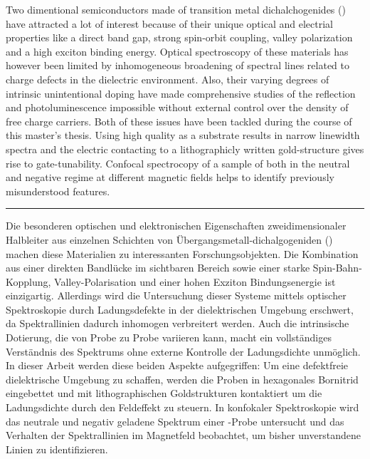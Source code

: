 
Two dimentional semiconductors made of transition metal dichalchogenides (\tmds\!) have attracted a lot of interest because of their unique optical and electrial properties like a direct band gap, strong spin-orbit coupling, valley polarization and a high exciton binding energy. Optical spectroscopy of these materials has however been limited by inhomogeneous broadening of spectral lines related to charge defects in the dielectric environment. Also, their varying degrees of intrinsic unintentional doping have made comprehensive studies of the reflection and photoluminescence impossible without external control over the density of free charge carriers. Both of these issues have been tackled during the course of this master's thesis. Using high quality \hbng as a substrate results in narrow linewidth \pl spectra and the electric contacting to a lithographicly written gold-structure gives rise to gate-tunability. Confocal spectrocopy of a sample of \wse both in the neutral and negative regime at different magnetic fields helps to identify previously misunderstood features.\newline
\begin{center}
\par\rule[8pt]{0.7\textwidth}{0.5pt}
\end{center}
Die besonderen optischen und elektronischen Eigenschaften zweidimensionaler Halbleiter aus einzelnen Schichten von Übergangsmetall-dichalgogeniden (\tmds\!) machen diese Materialien zu interessanten Forschungsobjekten. Die Kombination aus einer direkten Bandlücke im sichtbaren Bereich sowie einer starke Spin-Bahn-Kopplung, Valley-Polarisation und einer hohen Exziton Bindungsenergie ist einzigartig. Allerdings wird die Untersuchung dieser Systeme mittels optischer Spektroskopie durch Ladungsdefekte in der dielektrischen Umgebung erschwert, da Spektrallinien dadurch inhomogen verbreitert werden. Auch die intrinsische Dotierung, die von Probe zu Probe variieren kann, macht ein vollständiges Verständnis des Spektrums ohne externe Kontrolle der Ladungsdichte unmöglich. In dieser Arbeit werden diese beiden Aspekte aufgegriffen: Um eine defektfreie dielektrische Umgebung zu schaffen, werden die Proben in hexagonales Bornitrid eingebettet und mit lithographischen Goldstrukturen kontaktiert um die Ladungsdichte durch den Feldeffekt zu steuern. In konfokaler Spektroskopie wird das neutrale und negativ geladene Spektrum einer \wse\!-Probe untersucht und das Verhalten der Spektrallinien im Magnetfeld beobachtet, um bisher unverstandene Linien zu identifizieren.